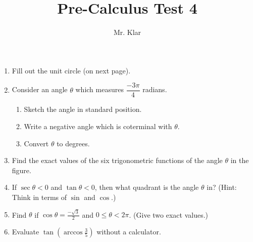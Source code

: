 \documentclass[letterpaper]{article}
\title{Pre-Calculus \linebreak
Test 4}
\author{Mr. Klar}
\date{}
\begin{document}

\maketitle

\begin{enumerate}
	\item Fill out the unit circle (on next page). 
	\item Consider an angle $\theta$ which measures $\dfrac{-3\pi}{4}$ radians. 
	\begin{enumerate}
		\item Sketch the angle in standard position. 
		\item Write a negative angle which is coterminal with $\theta$. 
		\item Convert $\theta$ to degrees. 
	\end{enumerate}
\item Find the exact values of the six trigonometric functions of the angle $\theta$ in the figure.
\item If $\sec\theta<0$ and $\tan\theta <0$, then what quadrant is the angle $\theta$ in? (Hint: Think in terms of $\sin$ and $\cos$.)
\item Find $\theta$ if $\cos\theta=\frac{-\sqrt{3}}{2}$ and $0\leq\theta<2\pi$. (Give two exact values.)
\item Evaluate $\tan(\arccos\frac{3}{5})$ without a calculator.
\end{enumerate}
\end{document}
